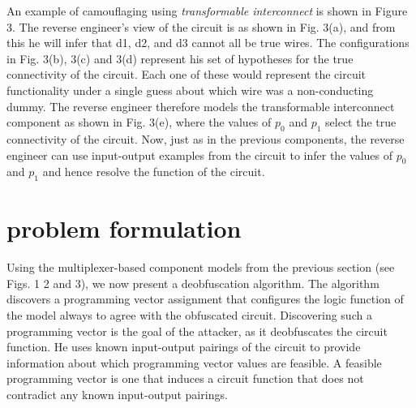 \documentclass[proposal]{umassthesis}  %
\begin{document}
An example of camouflaging using \textit{transformable interconnect} is shown in Figure 3. The reverse engineer's view of the circuit is as shown in Fig. 3(a), and from this he will infer that d1, d2, and d3 cannot all be true wires. The configurations in Fig. 3(b), 3(c) and 3(d) represent his set of hypotheses for the true connectivity of the circuit. Each one of these would represent the circuit functionality under a single guess about which wire was a non-conducting dummy. The reverse engineer therefore models the transformable interconnect component as shown in Fig. 3(e), where the values of $p_0$ and $p_1$ select the true connectivity of the circuit. Now, just as in the previous components, the reverse engineer can use input-output examples from the circuit to infer the values of $p_0$ and $p_1$ and hence resolve the function of the circuit. 


















\chapter{problem formulation}
Using the multiplexer-based component models from the previous section (see Figs. 1 2 and 3), we now present a deobfuscation algorithm. The algorithm discovers a programming vector assignment that configures the logic function of the model always to agree with the obfuscated circuit. Discovering such a programming vector is the goal of the attacker, as it deobfuscates the circuit function. He uses known input-output pairings of the circuit to provide information about which programming vector values are feasible. A feasible programming vector is one that induces a circuit function that does not contradict any known input-output pairings.



\end{document}
